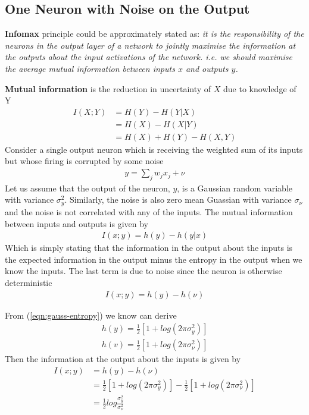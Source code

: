 \documentclass[class=article, crop=false]{standalone}
\numberwithin{equation}{section}
\begin{document}
\subsection{One Neuron with Noise on the Output}
\textbf{Infomax} principle could be approximately stated as: \textit{it is the responsibility of the neurons in the output layer of a network to jointly maximise the information at the outputs about the input activations of the network. i.e. we should maximise the average mutual information between inputs $x$ and outputs $y$.} 

\textbf{Mutual information} is the reduction in uncertainty of $X$ due to knowledge of Y
\begin{align*}
    I(X;Y)&=H(Y)-H(Y|X)\\
          &=H(X)-H(X|Y)\\
          &=H(X)+H(Y)-H(X, Y)
\end{align*}
Consider a single output neuron which is receiving the weighted sum of its inputs but whose firing is corrupted by some noise
\begin{align}
    y = \sum\limits_j w_jx_j + \nu
\end{align}
Let us assume that the output of the neuron, $y$, is a Gaussian random variable with variance $\sigma_y^2$. Similarly, the noise is also zero mean Guassian with variance $\sigma_{\nu}$ and the noise is not correlated with any of the inputs.
The mutual information between inputs and outputs is given by
\begin{align}
    I(x; y)=h(y)-h(y|x)
\end{align}
Which is simply stating that the information in the output about the inputs is the expected information in the output minus the entropy in the output when we know the inputs. The last term is due to noise since the neuron is otherwise deterministic
\begin{align}
    I(x;y) = h(y)-h(\nu)
\end{align}

From (\ref{eqn:gauss-entropy}) we know can derive
\begin{align*}
    h(y)=\frac{1}{2}[1+log(2\pi \sigma_y^2)] \\
    h(v)=\frac{1}{2}[1+log(2\pi\sigma_{\nu}^2)]
\end{align*}
Then the information at the output about the inputs is given by
\begin{align*}
    I(x;y)&=h(y)-h(\nu)\\
    &=\frac{1}{2}[1+log(2\pi \sigma_y^2)] - \frac{1}{2}[1+log(2\pi \sigma_{\nu}^2)]\\
    &=\frac{1}{2}log\frac{\sigma_y^2}{\sigma_{\nu}^2}
\end{align*}
\end{document}

